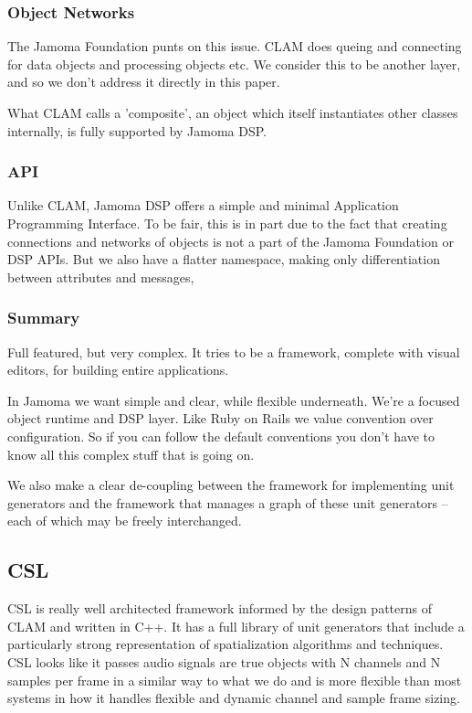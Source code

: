 \documentclass[twoside,10pt]{article}
\begin{document}
\subsubsection{Object Networks}

The Jamoma Foundation punts on this issue.  CLAM does queing and connecting for data objects and processing objects etc.  We consider this to be another layer, and so we don't address it directly in this paper.

What CLAM calls a 'composite', an object which itself instantiates other classes internally, is fully supported by Jamoma DSP.


\subsubsection{API}

Unlike CLAM, Jamoma DSP offers a simple and minimal Application Programming Interface.  To be fair, this is in part due to the fact that creating connections and networks of objects is not a part of the Jamoma Foundation or DSP APIs.  But we also have a flatter namespace, making only differentiation between attributes and messages,


\subsubsection{Summary}

Full featured, but very complex.  It tries to be a framework, complete with visual editors, for building entire applications.

In Jamoma we want simple and clear, while flexible underneath.  We're a focused object runtime and DSP layer.  Like Ruby on Rails we value convention over configuration.  So if you can follow the default conventions you don't have to know all this complex stuff that is going on.

We also make a clear de-coupling between the framework for implementing unit generators and the framework that manages a graph of these unit generators -- each of which may be freely interchanged.


\subsection{CSL} %

CSL is really well architected framework informed by the design patterns of CLAM and written in C++\cite{Pope:2003,Pope:2006}.  It has a full library of unit generators that include a particularly strong representation of spatialization algorithms and techniques.  CSL looks like it passes audio signals are true objects with N channels and N samples per frame in a similar way to what we do and is more flexible than most systems in how it handles flexible and dynamic channel and sample frame sizing.
\end{document}
